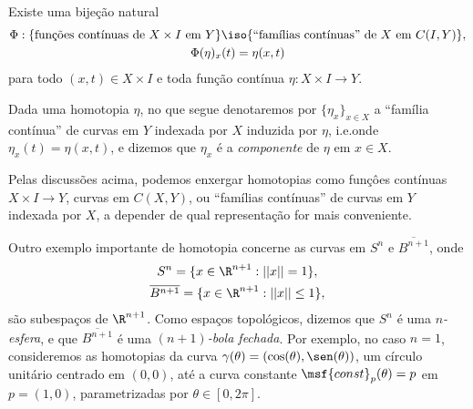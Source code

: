 \vspace{0.5em}

\begin{proposition}
    Existe uma bijeção natural
    \begin{equation*}
    \begin{gathered}
        \Phi : \{ \text{funções contínuas de $X \times I$ em $Y$} \} \iso \{ \text{``famílias contínuas'' de $X$ em $C(I, Y)$} \},
        \\
        \Phi(\eta)_x(t) = \eta(x, t)
    \end{gathered}
    \end{equation*}
    para todo $(x, t) \in X \times I$ e toda função contínua $\eta : X \times I \to Y$.
    \qedalt
\end{proposition}

\begin{convention}
    Dada uma homotopia $\eta$, no que segue denotaremos por $\{ \eta_x \}_{x \in X}$ a ``família contínua'' de curvas em $Y$ indexada por $X$ induzida por $\eta$, i.e.\@ onde $\eta_x(t) = \eta(x, t)$, e dizemos que $\eta_x$ é a \emph{componente} de $\eta$ em $x \in X$.
    \qedalt
\end{convention}

\begin{remark}
    Pelas discussões acima, podemos enxergar homotopias como funçôes contínuas $X \times I \to Y$, curvas em $C(X, Y)$, ou ``famílias contínuas'' de curvas em $Y$ indexada por $X$, a depender de qual representação for mais conveniente.
    \qedalt
\end{remark}

Outro exemplo importante de homotopia concerne as curvas em $S^n$ e $\overline{B^{n + 1}}$, onde
%
\begin{equation}
\begin{gathered}
    S^n = \{ x \in \R^{n + 1} : ||x|| = 1\},
    \\
    \overline{B^{n + 1}} = \{ x \in \R^{n + 1} : ||x|| \leq 1\},
\end{gathered}
\label{eq:sphere-ball}
\end{equation}
%
são subespaços de $\R^{n + 1}$. Como espaços topológicos, dizemos que $S^n$ é uma \emph{$n$-esfera}, e que $\overline{B^{n + 1}}$ é uma \emph{$(n + 1)$-bola fechada}. Por exemplo, no caso $n = 1$, consideremos as homotopias da curva $\gamma(\theta) = (\cos(\theta), \sen(\theta))$, um círculo unitário centrado em $(0, 0)$, até a curva constante $\msf{const}_p(\theta) = p$ em $p = (1, 0)$, parametrizadas por $\theta \in [0, 2\pi]$.%
\linebreak\vspace{-1.2em}

